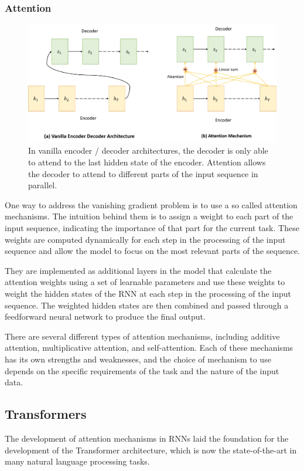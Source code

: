 \subsubsection*{Attention}
\begin{figure}[h]
    \includegraphics[width=\linewidth]{chapters/NLP/figures/attention.png}
    \caption{In vanilla encoder / decoder architectures, the decoder is only able to attend to the last hidden state of the encoder. Attention allows the decoder to attend to different parts of the input sequence in parallel.}
    \label{fig:attention}
\end{figure}
One way to address the vanishing gradient problem is to use a so called attention mechanisms.\cite{https://doi.org/10.48550/arxiv.1409.0473}
The intuition behind them is to assign a weight to each part of the input sequence, indicating the importance of that part for the current task.
These weights are computed dynamically for each step in the processing of the input sequence and allow the model to focus on the most relevant parts of the sequence.

They are implemented as additional layers in the model that calculate the attention weights using a set of learnable parameters and use these weights to weight the hidden states of the RNN at each step in the processing of the input sequence.
The weighted hidden states are then combined and passed through a feedforward neural network to produce the final output.

There are several different types of attention mechanisms, including additive attention, multiplicative attention, and self-attention. Each of these mechanisms has its own strengths and weaknesses, and the choice of mechanism to use depends on the specific requirements of the task and the nature of the input data.


\subsection{Transformers}
The development of attention mechanisms in RNNs laid the foundation for the development of the Transformer architecture, which is now the state-of-the-art in many natural language processing tasks.

